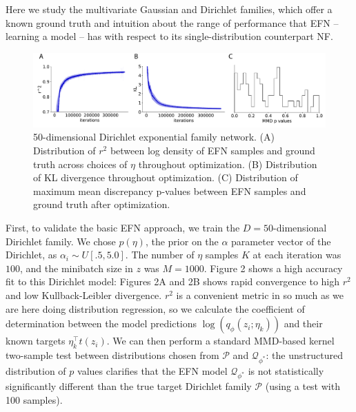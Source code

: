 \documentclass[twoside]{article}
\begin{document}
Here we study the multivariate Gaussian and Dirichlet families, which offer a known ground truth and intuition about the range of performance that EFN -- learning a model – has with respect to its single-distribution counterpart NF. 
%
\begin{figure}
  \centering
\includegraphics[width=1.0\linewidth]{figs/fig2/fig2.pdf}
  \caption{50-dimensional Dirichlet exponential family network.  (A) Distribution of $r^2$ between log density of EFN samples and ground truth across choices of $\eta$ throughout optimization.  (B) Distribution of KL divergence throughout optimization.  (C) Distribution of maximum mean discrepancy p-values between EFN samples and ground truth after optimization.}
\end{figure}
%
First, to validate the basic EFN approach, we train the $D=50$-dimensional Dirichlet family.  We chose $p(\eta)$, the prior on the $\alpha$ parameter vector of the Dirichlet, as $\alpha_i \sim U\left[.5, 5.0\right]$. The number of $\eta$ samples $K$ at each iteration was $100$, and the minibatch size in $z$ was $M=1000$.   Figure 2 shows a high accuracy fit to this Dirichlet model: Figures 2A and 2B shows rapid convergence to high $r^2$ and low Kullback-Leibler divergence.  $r^2$ is a convenient metric in so much as we are here doing distribution regression, so we calculate the coefficient of determination between the model predictions $\log (q_\phi(z_i; \eta_k))$ and their known targets $\eta_k^\top t(z_i)$.  We can then perform a standard MMD-based kernel two-sample test \citep{gretton2012kernel} between distributions chosen from $\mathcal{P}$ and $\mathcal{Q}_{\phi^*}$: the unstructured distribution of $p$ values clarifies that the EFN model $\mathcal{Q}_{\phi^*}$  is not statistically significantly different than the true target Dirichlet family $\mathcal{P}$ (using a test with 100 samples).
\end{document}
